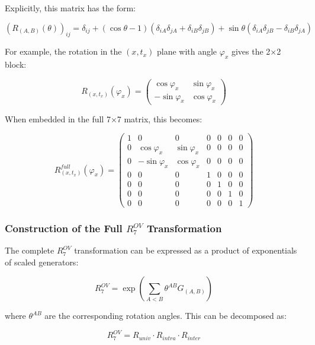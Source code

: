 \documentclass{article}
\begin{document}
Explicitly, this matrix has the form:

\begin{equation}
(R_{(A,B)}(\theta))_{ij} = \delta_{ij} + (\cos\theta - 1)(\delta_{iA}\delta_{jA} + \delta_{iB}\delta_{jB}) + \sin\theta(\delta_{iA}\delta_{jB} - \delta_{iB}\delta_{jA})
\end{equation}

For example, the rotation in the $(x,t_x)$ plane with angle $\varphi_x$ gives the 2×2 block:

\begin{equation}
R_{(x,t_x)}(\varphi_x) = \begin{pmatrix}
\cos\varphi_x & \sin\varphi_x \\
-\sin\varphi_x & \cos\varphi_x
\end{pmatrix}
\end{equation}

When embedded in the full 7×7 matrix, this becomes:

\begin{equation}
R_{(x,t_x)}^{full}(\varphi_x) = \begin{pmatrix}
1 & 0 & 0 & 0 & 0 & 0 & 0 \\
0 & \cos\varphi_x & \sin\varphi_x & 0 & 0 & 0 & 0 \\
0 & -\sin\varphi_x & \cos\varphi_x & 0 & 0 & 0 & 0 \\
0 & 0 & 0 & 1 & 0 & 0 & 0 \\
0 & 0 & 0 & 0 & 1 & 0 & 0 \\
0 & 0 & 0 & 0 & 0 & 1 & 0 \\
0 & 0 & 0 & 0 & 0 & 0 & 1
\end{pmatrix}
\end{equation}

\subsubsection{Construction of the Full $R^{OV}_7$ Transformation}

The complete $R^{OV}_7$ transformation can be expressed as a product of exponentials of scaled generators:

\begin{equation}
R^{OV}_7 = \exp\left(\sum_{A<B} \theta^{AB} G_{(A,B)}\right)
\end{equation}

where $\theta^{AB}$ are the corresponding rotation angles. This can be decomposed as:

\begin{equation}
R^{OV}_7 = R_{univ} \cdot R_{intra} \cdot R_{inter}
\end{equation}
\end{document}
